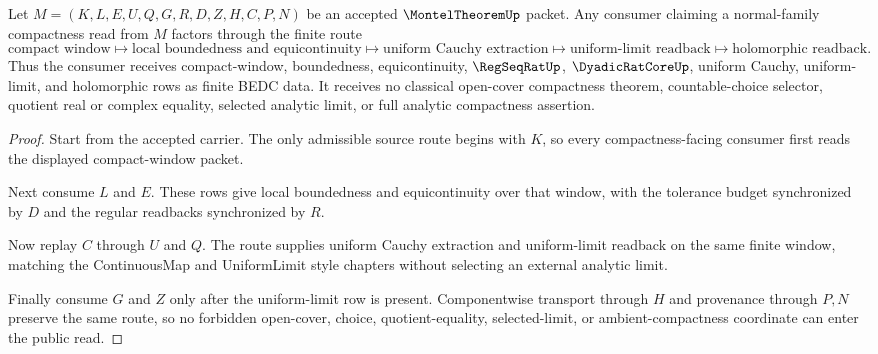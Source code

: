 \begin{theorem}
\label{thm:montel-theorem-finite-normal-family-criterion}
Let $M=(K,L,E,U,Q,G,R,D,Z,H,C,P,N)$ be an accepted $\MontelTheoremUp$ packet. Any consumer claiming a normal-family compactness read from $M$ factors through the finite route
$$
\text{compact window}
\longmapsto
\text{local boundedness and equicontinuity}
\longmapsto
\text{uniform Cauchy extraction}
\longmapsto
\text{uniform-limit readback}
\longmapsto
\text{holomorphic readback}.
$$
Thus the consumer receives compact-window, boundedness, equicontinuity, $\RegSeqRatUp$, $\DyadicRatCoreUp$, uniform Cauchy, uniform-limit, and holomorphic rows as finite BEDC data. It receives no classical open-cover compactness theorem, countable-choice selector, quotient real or complex equality, selected analytic limit, or full analytic compactness assertion.
\end{theorem}
\begin{proof}
Start from the accepted carrier. The only admissible source route begins with $K$, so every compactness-facing consumer first reads the displayed compact-window packet.

Next consume $L$ and $E$. These rows give local boundedness and equicontinuity over that window, with the tolerance budget synchronized by $D$ and the regular readbacks synchronized by $R$.

Now replay $C$ through $U$ and $Q$. The route supplies uniform Cauchy extraction and uniform-limit readback on the same finite window, matching the ContinuousMap and UniformLimit style chapters without selecting an external analytic limit.

Finally consume $G$ and $Z$ only after the uniform-limit row is present. Componentwise transport through $H$ and provenance through $P,N$ preserve the same route, so no forbidden open-cover, choice, quotient-equality, selected-limit, or ambient-compactness coordinate can enter the public read.
\end{proof}

